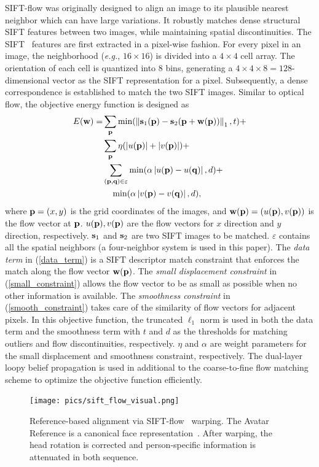 \documentclass[journal]{IEEEtran}
\begin{document}
SIFT-flow was originally designed to align an image to its plausible nearest neighbor which can have large variations. It robustly matches dense structural SIFT features between two images, while maintaining spatial discontinuities. The SIFT~\cite{Lowe_ICCV99} features are first extracted in a pixel-wise fashion. For every pixel in an image, the neighborhood (\textit{e.g.}, $16\times16$) is divided into a $4\times4$ cell array. The orientation of each cell is quantized into 8 bins, generating a $4\times4\times8=128$-dimensional vector as the SIFT representation for a pixel. Subsequently, a dense correspondence is established to match the two SIFT images. Similar to optical flow, the objective energy function is designed as
\begin{align}
	\label{data_term}
	E(\w)=&\sum_\p \min (\left\|\s_1 (\p)-\s_2 (\p+\w(\p))\right\|_1 ,t)+
\\\label{small_constraint}
&\sum_\p \eta(\left|u(\p)\right|+\left|v(\p)\right|) +
\\\nonumber
&\sum_{(\p,\q)\in\varepsilon} \min(\alpha\left|u(\p)-u(\q)\right|,d)+
\\\label{smooth_constraint}
&~~~\min(\alpha\left|v(\p)-v(\q)\right|,d),
\end{align}
where ${\bf p}=(x,y)$ is the grid coordinates of the images, and ${\bf w}({\bf p})=(u({\bf p}),v({\bf p}))$ is the flow vector at ${\bf p}$. $u({\bf p}),v({\bf p})$ are the flow vectors for $x$ direction and $y$ direction, respectively. ${\bf s}_1$ and ${\bf s}_2$ are two SIFT images to be matched. $\varepsilon$ contains all the spatial neighbors (a four-neighbor system is used in this paper). The \emph{data term} in (\ref{data_term}) is a SIFT descriptor match constraint that enforces the match along the flow vector ${\bf w}({\bf p})$. The \emph{small displacement constraint} in (\ref{small_constraint}) allows the flow vector to be as small as possible when no other information is available. The \emph{smoothness constraint} in (\ref{smooth_constraint}) takes care of the similarity of flow vectors for adjacent pixels. In this objective function, the truncated $\ell_1$ norm is used in both the data term and the smoothness term with $t$ and $d$ as the thresholds for matching outliers and flow discontinuities, respectively. $\eta$ and $\alpha$ are weight parameters for the small displacement and smoothness constraint, respectively. The dual-layer loopy belief propagation is used in additional to the coarse-to-fine flow matching scheme to optimize the objective function efficiently.

\begin{figure}[htbp]
	\centering
		\texttt{[image: pics/sift\_flow\_visual.png]}
	\caption{Reference-based alignment via SIFT-flow~\cite{Liu_PAMI11} warping. The Avatar Reference is a canonical face representation~\cite{Yang_SMCB12}. After warping, the head rotation is corrected and person-specific information is attenuated in both sequence.}
	\label{fig:sift_flow_visual}
\end{figure}
\end{document}
